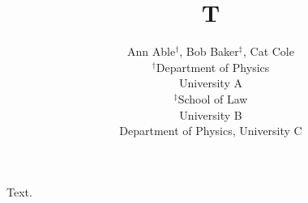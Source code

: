 \documentclass{article}
\title{T}
\author{Ann Able$^{\dagger}$, Bob Baker$^{\ddagger}$, Cat Cole \\ $^\dagger$Department of Physics \\ University A \\ $^\ddagger$School of Law \\ University B \\ Department of Physics, University C}
\begin{document}
\maketitle
Text.
\end{document}
